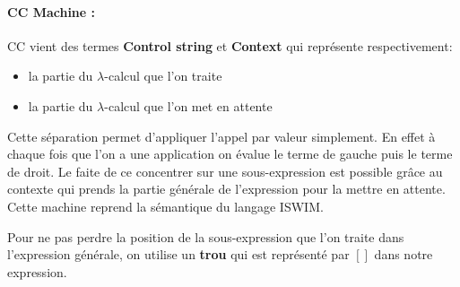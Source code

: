 \documentclass[10pt,a4paper]{article}
\begin{document}
			\paragraph{CC Machine :} CC vient des termes \textbf{Control string} et \textbf{Context} qui représente respectivement:
				\begin{itemize}
					\item la partie du $\lambda$-calcul que l'on traite
					\item la partie du $\lambda$-calcul que l'on met en attente 
				\end{itemize}
				Cette séparation permet d'appliquer l'appel par valeur simplement. En effet à chaque fois que l'on a une application on évalue le terme de gauche puis le terme de droit. Le faite de ce concentrer sur une sous-expression est possible grâce au contexte qui prends la partie générale de l'expression pour la mettre en attente. Cette machine reprend la sémantique du langage ISWIM. 
				\medbreak
				
				Pour ne pas perdre la position de la sous-expression que l'on traite dans l'expression générale, on utilise un \textbf{trou} qui est représenté par $[]$ dans notre expression.
				\bigbreak
				
\end{document}

